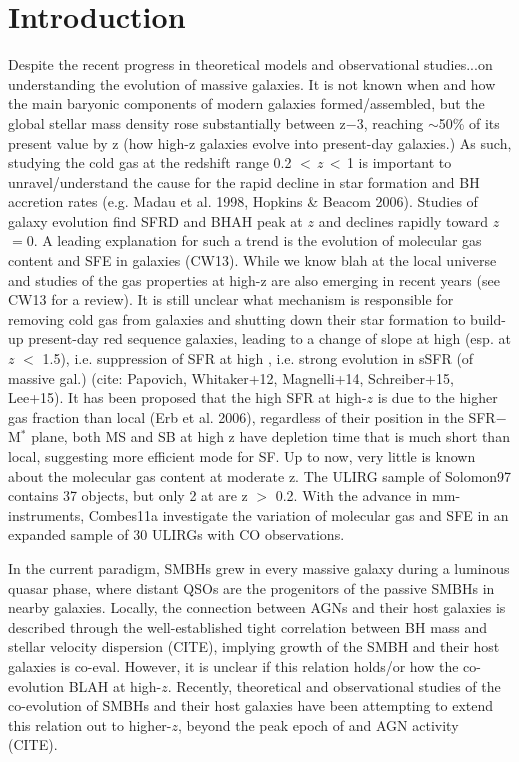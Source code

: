 \documentclass[]{emulateapj}
\begin{document}
\section{Introduction}
Despite the recent progress in theoretical models and observational studies...on understanding the evolution of massive galaxies.
It is not known when and how the main baryonic components of modern galaxies formed/assembled, but the global 
stellar mass density rose substantially between z$-$3, reaching $\sim$50\% of its present value by z 
(\ie how high-z galaxies evolve into present-day galaxies.)
As such, studying the cold gas at the redshift range 0.2 $<$\,$z$\,$<$\,1 is important to unravel/understand the cause for the rapid decline in star formation and BH accretion rates (e.g. Madau et al. 1998, Hopkins \& Beacom 2006). 
Studies of galaxy evolution find SFRD and BHAH peak at
$z$ and declines rapidly toward $z$$=$0. A leading explanation for such
a trend is the evolution of molecular gas content and SFE in galaxies (CW13).
While we know blah at the local universe and studies of the gas properties at
high-z are also emerging in recent years (see CW13 for a review). It is still
unclear what mechanism is responsible for removing cold gas from galaxies and
shutting down their star formation to build-up present-day red sequence
galaxies, leading to a change of slope at high \mstar (esp. at $z$ $<$ 1.5),  i.e.
suppression of SFR at high \mstar, i.e. strong evolution in sSFR (of massive gal.)
(cite: Papovich, Whitaker+12, Magnelli+14, Schreiber+15, Lee+15).
It has been proposed that the high SFR at high-$z$ is due to the higher gas fraction than local (Erb et al. 2006), 
regardless of their position in the SFR$-$M$^*$ plane, both MS and SB at high z have depletion time that is much 
short than local, suggesting more efficient mode for SF. 
Up to now, very little is known about the molecular gas content at moderate z. The ULIRG sample of Solomon97 contains 37 objects, but only 2 at are z $>$ 0.2. With the advance in mm-instruments, Combes11a investigate the variation of molecular gas and SFE in an expanded sample of 30 ULIRGs with CO observations.


In the current paradigm, SMBHs grew in every massive galaxy during a luminous quasar phase, 
where distant QSOs are the progenitors of the passive SMBHs in nearby galaxies.
Locally, the connection between AGNs and their host galaxies is described 
through the well-established tight correlation between BH mass 
and stellar velocity dispersion (CITE), implying growth of the SMBH and their host galaxies is co-eval.
However, it is unclear if this relation holds/or how the co-evolution BLAH at high-$z$.
Recently, theoretical and observational studies of the co-evolution of SMBHs and their host galaxies
have been attempting to extend this relation out to higher-$z$, beyond the peak epoch 
of \SF and AGN activity (CITE).
\end{document}
